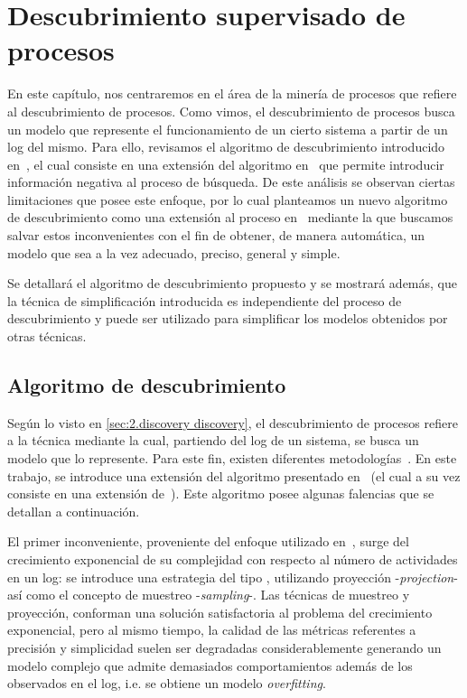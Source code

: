 \chapter{Descubrimiento supervisado de procesos}
\label{chap:3}

En este capítulo, nos centraremos en el área de la minería de procesos que refiere
al descubrimiento de procesos. Como vimos, el descubrimiento de procesos busca un modelo 
que represente el funcionamiento de un cierto sistema a partir de un log del mismo.
Para ello, revisamos el algoritmo de descubrimiento introducido en~\cite{LeonCB15},
el cual consiste en una extensión del algoritmo en~\cite{CarmonaC14} que permite 
introducir información negativa al proceso de búsqueda. De este análisis se observan 
ciertas limitaciones que posee este enfoque, por lo cual planteamos un nuevo 
algoritmo de descubrimiento como una extensión al proceso en~\cite{LeonCB15} mediante 
la que buscamos salvar estos inconvenientes con el fin de obtener, de manera automática, 
un modelo que sea a la vez adecuado, preciso, general y simple.

Se detallará el algoritmo de descubrimiento propuesto y se mostrará además,
que la técnica de simplificación introducida es independiente del proceso de descubrimiento
y puede ser utilizado para simplificar los modelos obtenidos por otras técnicas.

\section{Algoritmo de descubrimiento}
\label{sec:3.algodisco}

Según lo visto en \autoref{sec:2.discovery discovery}, el descubrimiento de procesos
refiere a la técnica mediante la cual, partiendo del log de un sistema, se busca
un modelo que lo represente.
Para este fin, existen diferentes metodologías~\cite{CarmonaC14,LeonCB15,MedeirosAW03,AalstWM04}.
En este trabajo, se introduce una extensión del algoritmo presentado en~\cite{LeonCB15} (el cual a
su vez consiste en una extensión de~\cite{CarmonaC14}). Este algoritmo posee algunas falencias
que se detallan a continuación.

El primer inconveniente, proveniente del enfoque utilizado en~\cite{CarmonaC14}, 
surge del crecimiento exponencial de su complejidad con respecto al número de actividades 
en un log: se introduce una estrategia del tipo , 
utilizando proyección -\textit{projection}- así como el concepto de muestreo -\textit{sampling}-.
Las técnicas de muestreo y proyección, conforman una solución satisfactoria al problema del
crecimiento exponencial, pero al mismo tiempo, la calidad de las métricas referentes a 
precisión y simplicidad suelen ser degradadas considerablemente generando un modelo complejo
que admite demasiados comportamientos además de los observados en el log, 
i.e. se obtiene un modelo \textit{overfitting}.

